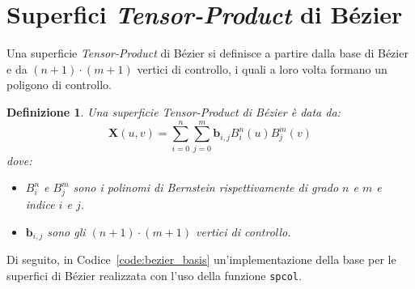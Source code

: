 \documentclass[a4paper, 10pt]{article}
\newtheorem{mydef}{Definizione}
\begin{document}
\section{Superfici \textit{Tensor-Product} di Bézier}
Una superficie \textit{Tensor-Product} di Bézier si definisce a partire dalla base di Bézier e da $(n+1)\cdot(m+1)$ vertici di controllo, i 
quali a loro volta formano un poligono di controllo. 
\begin{mydef}
  Una superficie \textit{Tensor-Product} di Bézier è data da:
  $$\mathbf{X}(u, v) = \sum_{i = 0}^{n} \sum_{j = 0}^{m} \mathbf{b}_{i, j} B^{n}_{i}(u)B_{j}^{m}(v) $$
  dove:
  \begin{itemize}
    \item $B^{n}_{i}$ e $B^{m}_{j}$ sono i polinomi di Bernstein rispettivamente di 
    grado $n$ e $m$ e indice $i$ e $j$.
    \item $\mathbf{b}_{i,j}$ sono gli  $(n+1)\cdot(m+1)$ vertici di controllo.
  \end{itemize}
\end{mydef}
Di seguito, in Codice~\ref{code:bezier_basis} un'implementazione della base
per le superfici di Bézier realizzata con l'uso della funzione \texttt{spcol}.


\end{document}
